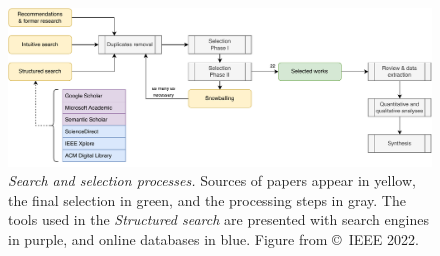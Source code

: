 \begin{figure}
  \centering
  \includegraphics[width=\textwidth]{figures/methodo-survey.drawio.pdf}
  \caption[
    Search and selection processes.
  ]{
    \emph{Search and selection processes.}
    Sources of papers appear in yellow, the final selection in green, and the processing steps in gray.
    The tools used in the \emph{Structured search} are presented with search engines in purple, and online databases in blue.
    Figure from \textcite{lavaur_EvolutionFederatedLearningbased_2022} \copyright~IEEE 2022.
    \label{fig:sota.methodo.original}
  }
\end{figure}

